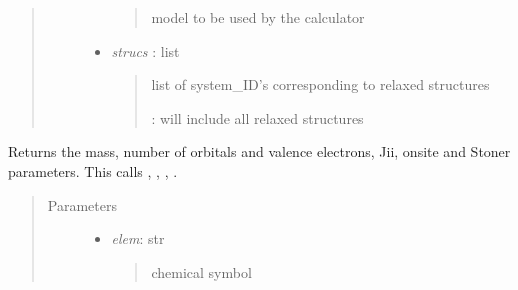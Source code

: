 \documentclass[letterpaper,10pt,english]{sphinxmanual}
\begin{document}
\begin{fulllineitems}
\begin{fulllineitems}
\begin{quote}
\begin{description}
\begin{itemize}
\begin{quote}
model to be used by the calculator
\end{quote}

\item {} 
\emph{strucs} : list
\begin{quote}

list of system\_ID's corresponding to relaxed structures

: will include all relaxed structures
\end{quote}

\end{itemize}

\end{description}\end{quote}

\end{fulllineitems}


\begin{fulllineitems}
\label{classes:catparam.CATParam.get_atoms_properties}
Returns the mass, number of orbitals and valence electrons, Jii,
onsite and Stoner parameters. This calls {\hyperref[classes:catparam.CATParam.gen_valenceelectrons]{}},
{\hyperref[classes:catparam.CATParam.gen_jii]{}}, {\hyperref[classes:catparam.CATParam.gen_stoner]{}}, {\hyperref[classes:catparam.CATParam.gen_onsite]{}}.
\begin{quote}\begin{description}
\item[{Parameters}] \leavevmode\begin{itemize}
\item {} 
\emph{elem}: str
\begin{quote}

chemical symbol
\end{quote}

\end{itemize}

\end{description}\end{quote}

\end{fulllineitems}



\end{fulllineitems}
\end{document}
